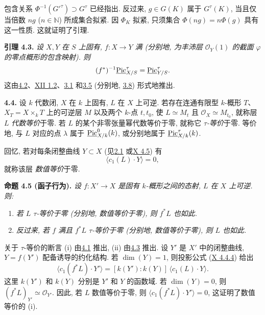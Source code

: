 包含关系 \(\Phi^{-1}(G'^\tau)\supset G^\tau\) 已经指出. 反过来, \(g\in G(K)\) 属于 \(G^\tau(K)\), 当且仅当倍数 \(ng\) (\(n\in\mathbb N\)) 所成集合拟紧. 因 \(\Phi_K\) 拟紧, 只须集合 \(\Phi(ng)=n\Phi(g)\) 具有这一性质. 这就证明了引理.

\textbf{引理 4.3.} \emph{设 \(X,Y\) 在 \(S\) 上固有, \(f:X\to Y\) 满 (分别地, 为丰沛层 \(\mathcal O_Y(1)\) 的截面 \(\varphi\) 的零点概形的包含映射). 则}
\[
(f^*)^{-1}\underline{\operatorname{Pic}}^\tau_{X/S}
=\underline{\operatorname{Pic}}^\tau_{Y/S}.
\]
这由\hyperlink{sga6.e13.lem.4-2}{4.2}、\hyperlink{sga6.e12.cor.1-2}{XII 1.2}、\hyperlink{sga6.e13.lem.3-1}{3.1} 和\hyperlink{sga6.e13.thm.3-5}{3.5} (分别地, \hyperlink{sga6.e13.thm.3-8}{3.8}) 形式地推出.

\textbf{4.4.} 设 \(k\) 代数闭, \(X\) 在 \(k\) 上固有, \(L\) 在 \(X\) 上可逆. 若存在连通有限型 \(k\)-概形 \(T\)、\(X_T=X\times_kT\) 上的可逆层 \(M\) 以及两个 \(k\)-点 \(t,t_0\), 使 \(L\simeq M_t\) 且 \(\mathcal O_X\simeq M_{t_0}\), 就称层 \(L\) \emph{代数等价}于零. 若 \(L\) 的某个非零张量幂代数等价于零, 就称它 \emph{\(\tau\)-等价}于零. 等价地, 与 \(L\) 对应的点 \(\lambda\) 属于 \(\underline{\operatorname{Pic}}^0_{X/k}(k)\), 或分别地属于 \(\underline{\operatorname{Pic}}^\tau_{X/k}(k)\).

回忆, 若对每条闭整曲线 \(Y\subset X\) (见\hyperlink{sga6.e13.para.2-1}{2.1} 或\hyperlink{sga6.e10.sec.4.5}{X 4.5}) 有
\[
\langle c_1(L)\cdot Y\rangle=0,
\]
就称该层 \emph{数值等价}于零.

\textbf{命题 4.5 (函子行为).} \emph{设 \(f:X'\to X\) 是固有 \(k\)-概形之间的态射, \(L\) 在 \(X\) 上可逆. 则:}
\begin{enumerate}[label=(\roman*)]
\item \emph{若 \(L\) \(\tau\)-等价于零 (分别地, 数值等价于零), 则 \(f^*L\) 也如此.}
\item \emph{反过来, 若 \(f\) 满且 \(f^*L\) \(\tau\)-等价于零 (分别地, 数值等价于零), 则 \(L\) 也如此.}
\end{enumerate}

关于 \(\tau\)-等价的断言 (i) 由\hyperlink{sga6.e13.para.4-1}{4.1} 推出, (ii) 由\hyperlink{sga6.e13.lem.4-3}{4.3} 推出. 设 \(Y'\) 是 \(X'\) 中的闭整曲线, \(Y=f(Y')\) 配备诱导的约化结构. 若 \(\dim(Y)=1\), 则投影公式 (\hyperlink{sga6.e10.eq.4-4-4}{X 4.4.4}) 给出
\begin{equation}
\langle c_1(f^*L)\cdot Y'\rangle
=[k(Y'):k(Y)]\,\langle c_1(L)\cdot Y\rangle.
\tag{4.5.1}
\end{equation}
这里 \(k(Y')\) 和 \(k(Y)\) 分别是 \(Y'\) 和 \(Y\) 的函数域. 若 \(\dim(Y)=0\), 则 \((f^*L)_{Y'}\simeq\mathcal O_{Y'}\). 因此, 若 \(L\) 数值等价于零, 则 \(\langle c_1(f^*L)\cdot Y'\rangle=0\), 这证明了数值等价的 (i).

